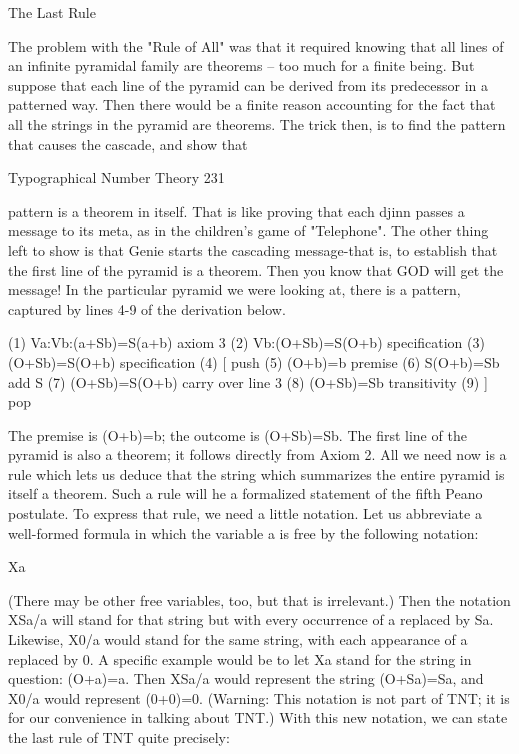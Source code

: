                                      The Last Rule

The problem with the "Rule of All" was that it required knowing that all lines of an
infinite pyramidal family are theorems -- too much for a finite being. But suppose that
each line of the pyramid can be derived from its predecessor in a patterned way. Then
there would be a finite reason accounting for the fact that all the strings in the pyramid
are theorems. The trick then, is to find the pattern that causes the cascade, and show that




Typographical Number Theory                                                             231

pattern is a theorem in itself. That is like proving that each djinn passes a message to its
meta, as in the children's game of "Telephone". The other thing left to show is that Genie
starts the cascading message-that is, to establish that the first line of the pyramid is a
theorem. Then you know that GOD will get the message!
        In the particular pyramid we were looking at, there is a pattern, captured by lines
4-9 of the derivation below.

   (1) Va:Vb:(a+Sb)=S(a+b)                   axiom 3
   (2) Vb:(O+Sb)=S(O+b)                      specification
   (3) (O+Sb)=S(O+b)                         specification
   (4) [                                     push
   (5) (O+b)=b                               premise
   (6) S(O+b)=Sb                             add S
   (7) (O+Sb)=S(O+b)                         carry over line 3
   (8) (O+Sb)=Sb                             transitivity
   (9) ]                                     pop

The premise is (O+b)=b; the outcome is (O+Sb)=Sb.
        The first line of the pyramid is also a theorem; it follows directly from Axiom 2.
All we need now is a rule which lets us deduce that the string which summarizes the
entire pyramid is itself a theorem. Such a rule will he a formalized statement of the fifth
Peano postulate.
        To express that rule, we need a little notation. Let us abbreviate a well-formed
formula in which the variable a is free by the following notation:

                                           X{a}

(There may be other free variables, too, but that is irrelevant.) Then the notation X{Sa/a}
will stand for that string but with every occurrence of a replaced by Sa. Likewise, X{0/a}
would stand for the same string, with each appearance of a replaced by 0.
        A specific example would be to let X{a} stand for the string in question: (O+a)=a.
Then X{Sa/a} would represent the string (O+Sa)=Sa, and X{0/a} would represent
(0+0)=0. (Warning: This notation is not part of TNT; it is for our convenience in talking
about TNT.)
        With this new notation, we can state the last rule of TNT quite precisely:

